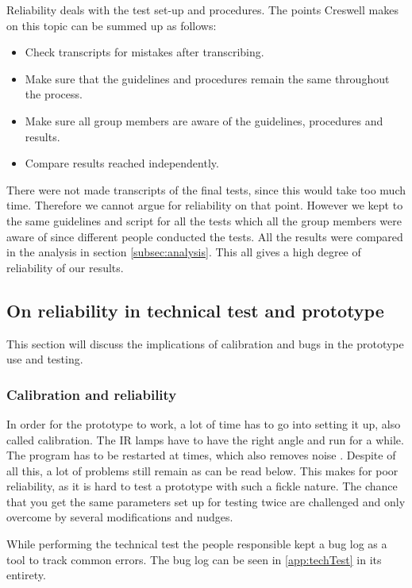 Reliability deals with the test set-up and procedures. The points Creswell \citep{Creswell} makes on this topic can be summed up as follows:

\begin{itemize}
\item Check transcripts for mistakes after transcribing.
\item Make sure that the guidelines and procedures remain the same throughout the process.
\item Make sure all group members are aware of the guidelines, procedures and results. 
\item Compare results reached independently.
\end{itemize}

There were not made transcripts of the final tests, since this would take too much time. Therefore we cannot argue for reliability on that point. However we kept to the same guidelines and script for all the tests which all the group members were aware of since different people conducted the tests. All the results were compared in the analysis in section \ref{subsec:analysis}. This all gives a high degree of reliability of our results. 

\subsection{On reliability in technical test and prototype}
This section will discuss the implications of calibration and bugs in the prototype use and testing. 
\subsubsection*{Calibration and reliability}
In order for the prototype to work, a lot of time has to go into setting it up, also called calibration. The IR lamps have to have the right angle and run for a while. The program has to be restarted at times, which also removes noise . Despite of all this, a lot of problems still remain as can be read below. This makes for poor reliability, as it is hard to test a prototype with such a fickle nature. The chance that you get the same parameters set up for testing twice are challenged and only overcome by several modifications and nudges.

While performing the technical test the people responsible kept a bug log as a tool to track common errors. The bug log can be seen in \ref{app:techTest}  in its entirety.

